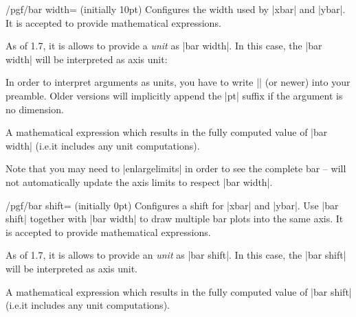 {\begin{key}{/pgf/bar width= (initially 10pt)}
    Configures the width used by |xbar| and |ybar|. It is accepted to provide
    mathematical expressions.

    As of \PGFPlots{} 1.7, it is allows to provide a \emph{unit} as
    |bar width|. In this case, the |bar width| will be interpreted as axis unit:
\begin{codeexample}[]
\end{codeexample}
    In order to interpret arguments as units, you have to write
    |\pgfplotsset{compat=1.7}| (or newer) into your preamble. Older versions
    will implicitly append the |pt| suffix if the argument is no dimension.

    \begin{command}{\pgfplotbarwidth}
        A mathematical expression which results in the fully computed value of
        |bar width| (i.e.\@ it includes any unit computations).
    \end{command}

    Note that you may need to |enlargelimits| in order to see the complete bar
    -- \PGFPlots{} will not automatically update the axis limits to respect
    |bar width|.
\end{key}

\begin{key}{/pgf/bar shift= (initially 0pt)}
    Configures a shift for |xbar| and |ybar|. Use |bar shift| together with
    |bar width| to draw multiple bar plots into the same axis. It is accepted
    to provide mathematical expressions.

    As of \PGFPlots{} 1.7, it is allows to provide an \emph{unit} as
    |bar shift|. In this case, the |bar shift| will be interpreted as axis unit.

    \begin{command}{\pgfplotbarshift}
        A mathematical expression which results in the fully computed value of
        |bar shift| (i.e.\@ it includes any unit computations).
    \end{command}


\end{key}}
